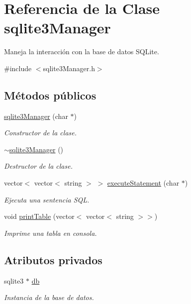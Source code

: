 \hypertarget{classsqlite3_manager}{}\section{Referencia de la Clase sqlite3\+Manager}
\label{classsqlite3_manager}


Maneja la interacción con la base de datos S\+Q\+Lite.  




{\ttfamily \#include $<$sqlite3\+Manager.\+h$>$}

\subsection*{Métodos públicos}
\begin{DoxyCompactItemize}
\item 
\hyperlink{classsqlite3_manager_ae1ae1bbb453ea690ef68f5ea1a9b39ed}{sqlite3\+Manager} (char $\ast$)
\begin{DoxyCompactList}\small\item\em Constructor de la clase. \end{DoxyCompactList}\item 
\hyperlink{classsqlite3_manager_ad03a31151cbc5ccc52f0c2936bddb34b}{$\sim$sqlite3\+Manager} ()
\begin{DoxyCompactList}\small\item\em Destructor de la clase. \end{DoxyCompactList}\item 
vector$<$ vector$<$ string $>$ $>$ \hyperlink{classsqlite3_manager_ad619df24f9d979b179df8a472340a31e}{execute\+Statement} (char $\ast$)
\begin{DoxyCompactList}\small\item\em Ejecuta una sentencia S\+Q\+L. \end{DoxyCompactList}\item 
void \hyperlink{classsqlite3_manager_ac3b8080a48f4fa15df51d32f66f169eb}{print\+Table} (vector$<$ vector$<$ string $>$$>$)
\begin{DoxyCompactList}\small\item\em Imprime una tabla en consola. \end{DoxyCompactList}\end{DoxyCompactItemize}
\subsection*{Atributos privados}
\begin{DoxyCompactItemize}
\item 
sqlite3 $\ast$ \hyperlink{classsqlite3_manager_a9ccf7ca16db10c327a05a5a90f6ee1a5}{db}
\begin{DoxyCompactList}\small\item\em Instancia de la base de datos. \end{DoxyCompactList}\end{DoxyCompactItemize}


